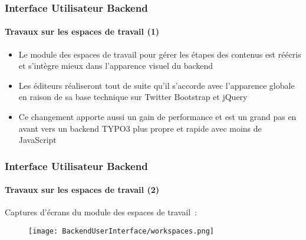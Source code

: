 \begin{frame}[fragile]
	\frametitle{Interface Utilisateur Backend}
	\framesubtitle{Travaux sur les espaces de travail (1)}

	\begin{itemize}

		\item Le module des espaces de travail pour gérer les étapes des contenus est réécris
			et s'intègre mieux dans l'apparence visuel du backend

		\item Les éditeurs réaliseront tout de suite qu'il s'accorde avec l'apparence globale
			en raison de sa base technique sur Twitter Bootstrap et jQuery

		\item Ce changement apporte aussi un gain de performance et est un grand pas en avant
			vers un backend TYPO3 plus propre et rapide avec moins de JavaScript

	\end{itemize}

\end{frame}

\begin{frame}[fragile]
	\frametitle{Interface Utilisateur Backend}
	\framesubtitle{Travaux sur les espaces de travail (2)}

	Captures d'écrans du module des espaces de travail~:

	\begin{figure}
		\texttt{[image: BackendUserInterface/workspaces.png]}
	\end{figure}

\end{frame}

